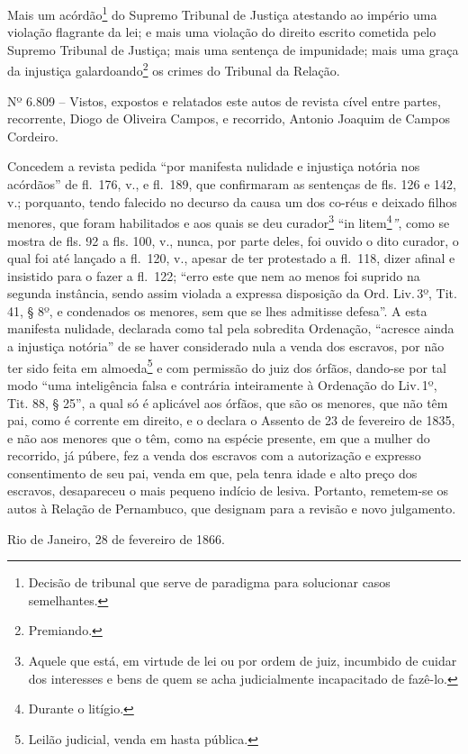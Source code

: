 Mais um acórdão\footnote{Decisão de tribunal que serve de paradigma
  para solucionar casos semelhantes.} do Supremo Tribunal de Justiça
atestando ao império uma violação flagrante da lei; e mais uma violação
do direito escrito cometida pelo Supremo Tribunal de Justiça; mais uma
sentença de impunidade; mais uma graça da injustiça
galardoando\footnote{Premiando.} os crimes do Tribunal da Relação.

Nº 6.809 -- Vistos, expostos e relatados este autos de revista cível
entre partes, recorrente, Diogo de Oliveira Campos, e recorrido, Antonio
Joaquim de Campos Cordeiro.

Concedem a revista pedida ``por manifesta nulidade e injustiça notória
nos acórdãos'' de fl.~176, v., e fl.~189, que confirmaram as sentenças de
fls. 126 e 142, v.; porquanto, tendo falecido no decurso da causa um dos
co-réus e deixado filhos menores, que foram habilitados e aos quais se
deu curador\footnote{Aquele que está, em virtude de lei ou por ordem
  de juiz, incumbido de cuidar dos interesses e bens de quem se acha
  judicialmente incapacitado de fazê-lo.} ``in litem\footnote{Durante o
  litígio.}\emph{''}, como se mostra de fls. 92 a fls. 100, v., nunca,
por parte deles, foi ouvido o dito curador, o qual foi até lançado a
fl.~120, v., apesar de ter protestado a fl.~118, dizer afinal e
insistido para o fazer a fl.~122; ``erro este que nem ao menos foi
suprido na segunda instância, sendo assim violada a expressa disposição
da Ord. Liv.\,3º, Tit. 41, § 8º, e condenados os menores, sem que se lhes
admitisse defesa''. A esta manifesta nulidade, declarada como tal pela
sobredita Ordenação, ``acresce ainda a injustiça notória'' de se haver
considerado nula a venda dos escravos, por não ter sido feita em
almoeda\footnote{Leilão judicial, venda em hasta pública.} e com
permissão do juiz dos órfãos, dando-se por tal modo ``uma inteligência
falsa e contrária inteiramente à Ordenação do Liv.\,1º, Tit. 88, § 25'', a
qual só é aplicável aos órfãos, que são os menores, que não têm pai,
como é corrente em direito, e o declara o Assento de 23 de fevereiro de
1835, e não aos menores que o têm, como na espécie presente, em que a
mulher do recorrido, já púbere, fez a venda dos escravos com a
autorização e expresso consentimento de seu pai, venda em que, pela
tenra idade e alto preço dos escravos, desapareceu o mais pequeno
indício de lesiva. Portanto, remetem-se os autos à Relação de
Pernambuco, que designam para a revisão e novo julgamento.

Rio de Janeiro, 28 de fevereiro de 1866.

